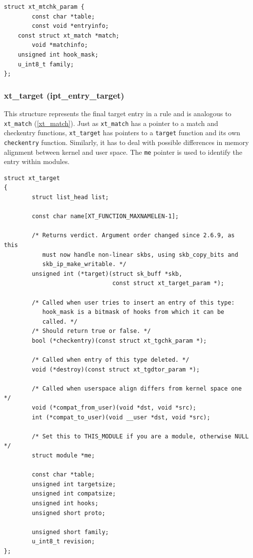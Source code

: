 \documentclass[a4paper,10pt]{article}
\newcommand{\code}[1]{\texttt{{#1}}}
\begin{document}
\begin{lstlisting}
struct xt_mtchk_param {
        const char *table;
        const void *entryinfo;
	const struct xt_match *match;
        void *matchinfo;
	unsigned int hook_mask;
	u_int8_t family;
};
\end{lstlisting}

\subsubsection{xt\_target (ipt\_entry\_target)}

This structure represents the final target entry in a rule and is
analogous to \code{xt\_match} (\ref{xt_match}). Just as
\code{xt\_match} has a pointer to a match and checkentry functions,
\code{xt\_target} has pointers to a \code{target} function and its own
\code{checkentry} function. Similarly, it has to deal with possible
differences in memory alignment between kernel and user space. The
\code{me} pointer is used to identify the entry within modules.

\begin{lstlisting}
struct xt_target
{
        struct list_head list;

        const char name[XT_FUNCTION_MAXNAMELEN-1];

        /* Returns verdict. Argument order changed since 2.6.9, as this                                                                                     
           must now handle non-linear skbs, using skb_copy_bits and                                                                                         
           skb_ip_make_writable. */
        unsigned int (*target)(struct sk_buff *skb,
                               const struct xt_target_param *);

        /* Called when user tries to insert an entry of this type:                                                                                          
           hook_mask is a bitmask of hooks from which it can be                                                                                             
           called. */
        /* Should return true or false. */
        bool (*checkentry)(const struct xt_tgchk_param *);

        /* Called when entry of this type deleted. */
        void (*destroy)(const struct xt_tgdtor_param *);

        /* Called when userspace align differs from kernel space one */
        void (*compat_from_user)(void *dst, void *src);
        int (*compat_to_user)(void __user *dst, void *src);

        /* Set this to THIS_MODULE if you are a module, otherwise NULL */
        struct module *me;

        const char *table;
        unsigned int targetsize;
        unsigned int compatsize;
        unsigned int hooks;
        unsigned short proto;

        unsigned short family;
        u_int8_t revision;
};
\end{lstlisting}
\end{document}
